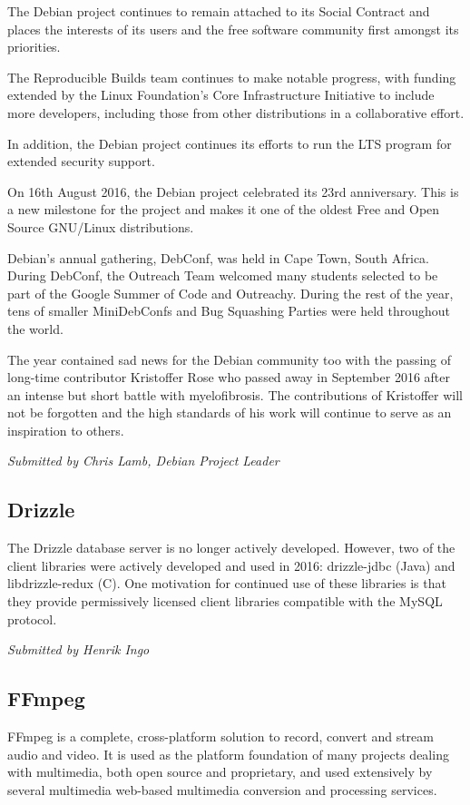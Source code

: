 \documentclass[letterpaper]{report}
\begin{document}
The Debian project continues to remain attached to its Social Contract
and places the interests of its users and the free software community
first amongst its priorities.

The Reproducible Builds team continues to make notable progress, with
funding extended by the Linux Foundation's Core Infrastructure
Initiative to include more developers, including those from other
distributions in a collaborative effort.

In addition, the Debian project continues its efforts to run the LTS
program for extended security support.

On 16th August 2016, the Debian project celebrated its 23rd anniversary.
This is a new milestone for the project and makes it one of the oldest
Free and Open Source GNU/Linux distributions.

Debian's annual gathering, DebConf, was held in Cape Town, South Africa.
During DebConf, the Outreach Team welcomed many students selected to be
part of the Google Summer of Code and Outreachy. During the rest of the
year, tens of smaller MiniDebConfs and Bug Squashing Parties were held
throughout the world.

The year contained sad news for the Debian community too with the
passing of long-time contributor Kristoffer Rose who passed away in
September 2016 after an intense but short battle with myelofibrosis. The
contributions of Kristoffer will not be forgotten and the high standards
of his work will continue to serve as an inspiration to others.

{\em Submitted by Chris Lamb, Debian Project Leader}

\subsection{Drizzle}

The Drizzle database server is no longer actively developed. However,
two of the client libraries were actively developed and used in 2016:
drizzle-jdbc (Java) and libdrizzle-redux (C). One motivation for
continued use of these libraries is that they provide permissively
licensed client libraries compatible with the MySQL protocol.

{\em Submitted by Henrik Ingo}

\subsection{FFmpeg}

FFmpeg is a complete, cross-platform solution to record, convert and
stream audio and video. It is used as the platform foundation of many
projects dealing with multimedia, both open source and proprietary, and
used extensively by several multimedia web-based multimedia conversion
and processing services.
\end{document}
